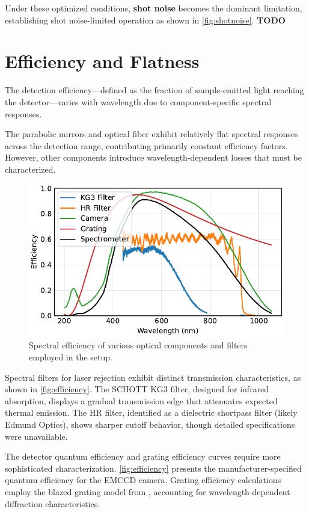 \documentclass[
	parskip=half,
	a4paper,
]{scrarticle}
\begin{document}
Under these optimized conditions, \textbf{shot noise} becomes the dominant limitation, establishing shot noise-limited operation as shown in \autoref{fig:shotnoise}. \textbf{TODO}

\section{Efficiency and Flatness}

The detection efficiency—defined as the fraction of sample-emitted light reaching the detector—varies with wavelength due to component-specific spectral responses.

The parabolic mirrors and optical fiber exhibit relatively flat spectral responses across the detection range, contributing primarily constant efficiency factors. However, other components introduce wavelength-dependent losses that must be characterized.

\begin{figure}[hb]
    \centering
    \includegraphics{../analysis/figures/filter.pdf}
    \caption{Spectral efficiency of various optical components and filters employed in the setup.}
    \label{fig:efficiency}
\end{figure}

Spectral filters for laser rejection exhibit distinct transmission characteristics, as shown in \autoref{fig:efficiency}. The SCHOTT KG3 filter, designed for infrared absorption, displays a gradual transmission edge that attenuates expected thermal emission. The HR filter, identified as a dielectric shortpass filter (likely Edmund Optics), shows sharper cutoff behavior, though detailed specifications were unavailable.

The detector quantum efficiency and grating efficiency curves require more sophisticated characterization. \autoref{fig:efficiency} presents the manufacturer-specified quantum efficiency for the EMCCD camera. Grating efficiency calculations employ the blazed grating model from \cite{barker_ripple_1984}, accounting for wavelength-dependent diffraction characteristics.
\end{document}
